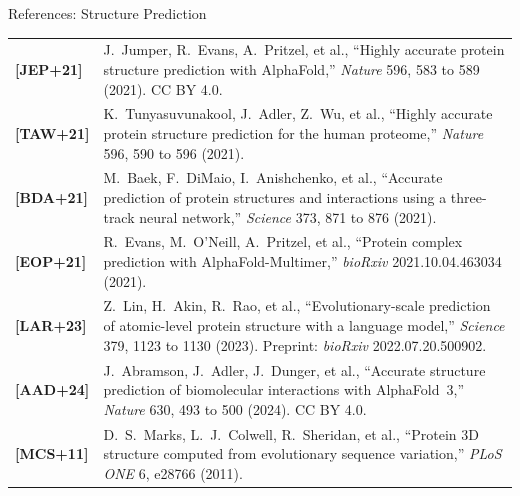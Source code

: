 \documentclass[11pt,aspectratio=169]{beamer}
\begin{document}
\begin{frame}[t]{References: Structure Prediction}
  \vspace{-2mm}
  \scriptsize
  \renewcommand{\arraystretch}{1.25}
  \setlength{\tabcolsep}{1.2mm}
  \begin{tabular}{@{}l>{\raggedright\arraybackslash}p{}@{}}
    \textbf{[JEP+21]} & J.~Jumper, R.~Evans, A.~Pritzel, et al., ``Highly accurate protein structure prediction with AlphaFold,'' \textit{Nature} 596, 583 to 589 (2021). CC BY 4.0. \\
    \textbf{[TAW+21]} & K.~Tunyasuvunakool, J.~Adler, Z.~Wu, et al., ``Highly accurate protein structure prediction for the human proteome,'' \textit{Nature} 596, 590 to 596 (2021). \\
    \textbf{[BDA+21]} & M.~Baek, F.~DiMaio, I.~Anishchenko, et al., ``Accurate prediction of protein structures and interactions using a three-track neural network,'' \textit{Science} 373, 871 to 876 (2021). \\
    \textbf{[EOP+21]} & R.~Evans, M.~O'Neill, A.~Pritzel, et al., ``Protein complex prediction with AlphaFold-Multimer,'' \textit{bioRxiv} 2021.10.04.463034 (2021). \\
    \textbf{[LAR+23]} & Z.~Lin, H.~Akin, R.~Rao, et al., ``Evolutionary-scale prediction of atomic-level protein structure with a language model,'' \textit{Science} 379, 1123 to 1130 (2023). Preprint: \textit{bioRxiv} 2022.07.20.500902. \\
    \textbf{[AAD+24]} & J.~Abramson, J.~Adler, J.~Dunger, et al., ``Accurate structure prediction of biomolecular interactions with AlphaFold~3,'' \textit{Nature} 630, 493 to 500 (2024). CC BY 4.0. \\
    \textbf{[MCS+11]} & D.~S.~Marks, L.~J.~Colwell, R.~Sheridan, et al., ``Protein 3D structure computed from evolutionary sequence variation,'' \textit{PLoS ONE} 6, e28766 (2011). \\
  \end{tabular}
\end{frame}
\end{document}
